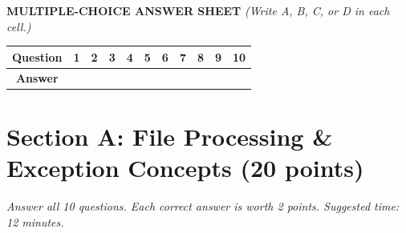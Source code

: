 \documentclass[11pt,a4paper]{article}
\begin{document}
\vspace{1mm}
\textbf{MULTIPLE-CHOICE ANSWER SHEET} \textit{(Write A, B, C, or D in each cell.)}
\begin{center}\setlength{\tabcolsep}{5pt}\renewcommand{\arraystretch}{1.1}
\begin{tabular}{|c|c|c|c|c|c|c|c|c|c|c|}\hline
\textbf{Question} & \textbf{1} & \textbf{2} & \textbf{3} & \textbf{4} & \textbf{5} & \textbf{6} & \textbf{7} & \textbf{8} & \textbf{9} & \textbf{10} \\ \hline
\textbf{Answer} & & & & & & & & & & \\[1.5mm] \hline
\end{tabular}\end{center}
\vspace{-2.5mm}
\section*{Section A: File Processing \& Exception Concepts \hfill \normalsize\normalfont(20 points)}
\textit{Answer all 10 questions. Each correct answer is worth 2 points. Suggested time: 12 minutes.}
\end{document}
